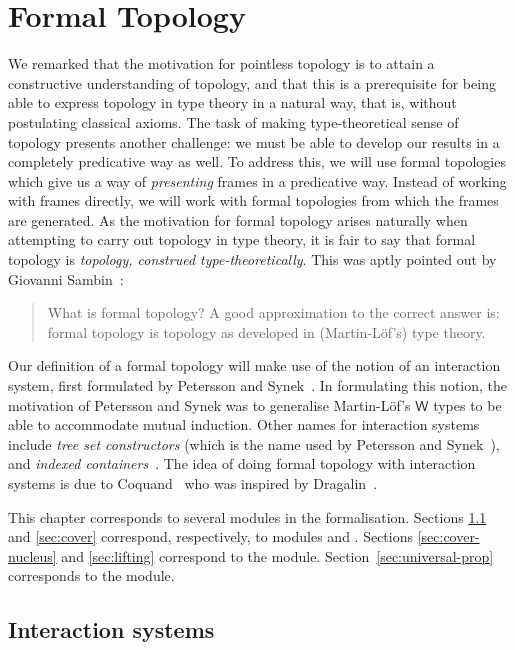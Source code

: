 \chapter{Formal Topology}\label{chap:formal-topo}

We remarked that the motivation for pointless topology is to attain a constructive
understanding of topology, and that this is a prerequisite for being able to express
topology in type theory in a natural way, that is, without postulating classical axioms.
The task of making type-theoretical sense of topology presents another challenge: we must
be able to develop our results in a completely predicative way as well. To address this,
we will use formal topologies which give us a way of \emph{presenting} frames in a
predicative way. Instead of working with frames directly, we will work with formal
topologies from which the frames are generated. As the motivation for formal topology
arises naturally when attempting to carry out topology in type theory, it is fair to say
that formal topology is \emph{topology, construed type-theoretically}. This was aptly
pointed out by Giovanni Sambin~\cite{sambin-domains}:
\begin{quote}
  What is formal topology? A good approximation to the correct answer is: formal topology
  is topology as developed in (Martin-Löf's) type theory.
\end{quote}

Our definition of a formal topology will make use of the notion of an interaction system,
first formulated by Petersson and Synek~\cite{tree-sets}. In formulating this notion, the
motivation of Petersson and Synek was to generalise Martin-Löf's $\mathsf{W}$ types to be
able to accommodate mutual induction. Other names for interaction systems include
\emph{tree set constructors} (which is the name used by Petersson and
Synek~\cite{tree-sets}), and \emph{indexed containers}~\cite{indexed-containers}. The idea
of doing formal topology with interaction systems is due to Coquand~\cite{coq-posets} who
was inspired by Dragalin~\cite{dragalin}.

This chapter corresponds to several modules in the \veragda{} formalisation. Sections
\ref{sec:intr-sys} and \ref{sec:cover} correspond, respectively, to modules
 and . Sections \ref{sec:cover-nucleus} and
\ref{sec:lifting} correspond to the  module.
Section~\ref{sec:universal-prop} corresponds to the  module.

\section{Interaction systems}\label{sec:intr-sys}

